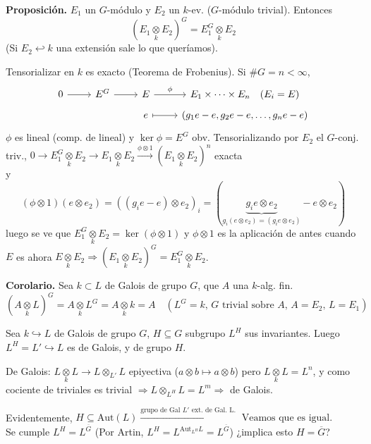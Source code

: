 \noindent \textbf{Proposici\'on.} $E_1$ un $G$-módulo y $E_2$ un $k$-ev. ($G$-m\'odulo trivial). Entonces
\[ (E_1 \underset{k}{\otimes} E_2)^G = E_1^G \underset{k}{\otimes} E_2 \]
(Si $E_2 \hookleftarrow k$ una extensi\'on sale lo que queríamos).

\begin{dem}
Tensorializar en $k$ es exacto (Teorema de Frobenius). Si $\#G = n < \infty$,
\[ \bt 0 \rar & E^G \rar & E \rar{\phi} & E_1 \times \dots \times E_n \quad (E_i = E)  \\[-5mm]  
& & e \rarmaps & (g_1 e - e, g_2 e - e, \dots, g_n e - e) \et\]
$\phi$ es lineal (comp. de lineal) y $\ker \phi = E^G$ obv. Tensorializando por $E_2$ el $G$-conj. triv., $0 \longrightarrow E_1^G \underset{k}{\otimes} E_2 \longrightarrow E_1 \underset{k}{\otimes} E_2 \xrightarrow{\phi \otimes 1} (E_1 \underset{k}{\otimes} E_2)^n$ exacta \\
y 
$$(\phi \otimes 1) (e \otimes e_2) = ( (g_i e - e) \otimes e_2 )_i = ( \underbrace{g_i e \otimes e_2 }_{g_i (e \otimes e_2) = (g_i e \otimes e_2)} - e \otimes e_2 )$$
luego se ve que $E_1^G \underset{k}{\otimes} E_2 = \ker (\phi \otimes 1)$ y $\phi \otimes 1$ es la aplicaci\'on de antes cuando $E$ es ahora $E \underset{k}{\otimes} E_2 \Rightarrow (E_1 \underset{k}{\otimes} E_2)^G = E_1^G \underset{k}{\otimes} E_2$. \\ 
\end{dem}

\noindent \textbf{Corolario.} Sea $k \subset L$ de Galois de grupo $G$, que $A$ una $k$-alg. fin.
\[ (A \underset{k}{\otimes} L)^G = A\underset{k}{\otimes} L^G = A \underset{k}{\otimes} k = A \quad (L^G = k, \, G \text{ trivial sobre } A, \, A = E_2, \, L = E_1) \]

\begin{prop} Sea $k \hookrightarrow L$ de Galois de grupo $G$, $H \subseteq G$ subgrupo $L^H$ sus invariantes. Luego $L^H = L' \hookrightarrow L$ es de Galois, y de grupo $H$. \end{prop}
\begin{dem}
De Galois: $L \underset{k}{\otimes} L \longrightarrow L \otimes_{L'} L$ epiyectiva ($a\otimes b \longmapsto a\otimes b$) pero $L \underset{k}{\otimes} L = L^n$, y como cociente de triviales es trivial $\Rightarrow L \otimes_{L^H} L = L^m \Rightarrow$ de Galois.
\end{dem}

\noindent Evidentemente, $H \subseteq \text{Aut}(L) \xrightarrow{\text{grupo de Gal } L' \text{ ext. de Gal. L.}} \text{ Veamos que es igual.}$ \\
Se cumple $L^H = L^{\overline{G}}$ (Por Artin, $L^H = L^{\text{Aut}_{L^H} L} = L^{\overline{G}}$) ¿implica esto $H = \overline{G}$?

